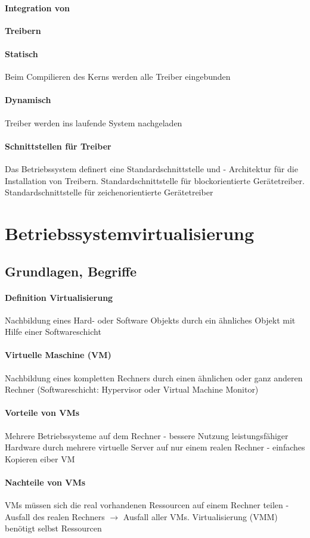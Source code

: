 \documentclass[11pt,a4paper,landscape]{article}
\begin{document}
\begin{multicols*}{3}
	\paragraph{Integration von} \textbf{Treibern}
	\paragraph{Statisch} Beim Compilieren des Kerns werden alle Treiber eingebunden
	\paragraph{Dynamisch} Treiber werden ins laufende System nachgeladen
	\paragraph{Schnittstellen für Treiber} Das Betriebssystem definert eine Standardschnittstelle und - Architektur für die Installation von Treibern. Standardschnittstelle für blockorientierte Gerätetreiber. Standardschnittstelle für zeichenorientierte Gerätetreiber
	\section{Betriebssystemvirtualisierung}
	\subsection{Grundlagen, Begriffe}
	\paragraph{Definition Virtualisierung} Nachbildung eines Hard- oder Software Objekts durch ein ähnliches Objekt mit Hilfe einer Softwareschicht
	\paragraph{Virtuelle Maschine (VM)} Nachbildung eines kompletten Rechners durch einen ähnlichen oder ganz anderen Rechner (Softwareschicht: Hypervisor oder Virtual Machine Monitor)
	\paragraph{Vorteile von VMs} Mehrere Betriebssysteme auf dem Rechner - bessere Nutzung leistungsfähiger Hardware durch mehrere virtuelle Server auf nur einem realen Rechner - einfaches Kopieren eiber VM
	\paragraph{Nachteile von VMs} VMs müssen sich die real vorhandenen Ressourcen auf einem Rechner teilen - Ausfall des realen Rechners $\rightarrow$ Ausfall aller VMs. Virtualisierung (VMM) benötigt selbst Ressourcen

\end{multicols*}
\end{document}
